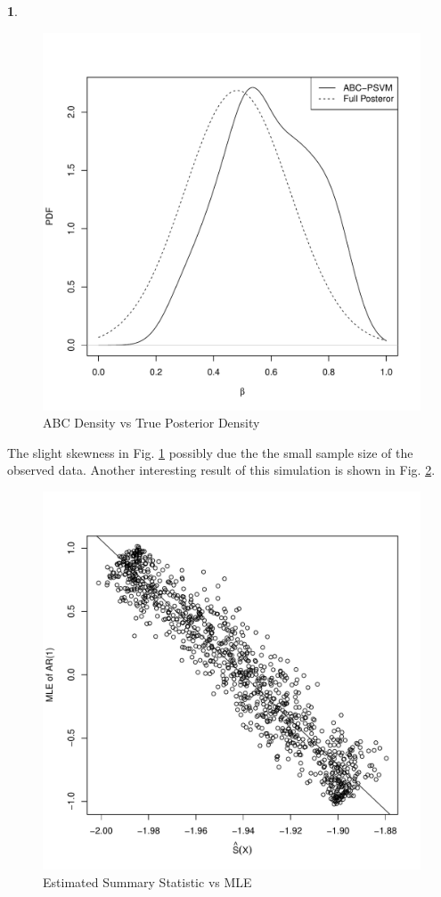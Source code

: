 \documentclass[oneside,english]{amsbook}
\numberwithin{section}{chapter}
\numberwithin{equation}{section}
\numberwithin{figure}{section}
\theoremstyle{plain}
\theoremstyle{plain}
\theoremstyle{definition}
\theoremstyle{plain}
\theoremstyle{plain}
\theoremstyle{remark}
\theoremstyle{definition}
\newtheorem{example}{\protect\examplename}
\theoremstyle{definition}
\providecommand{\examplename}{Example}
\begin{document}
\begin{example}
\begin{figure}
\includegraphics[scale=0.7]{ABCvsFull_100_1000_4.pdf}\protect\caption{ABC Density vs True Posterior Density\label{fig:ABC-vs-True}}
\end{figure}
The slight skewness in Fig. \ref{fig:ABC-vs-True} possibly due the
the small sample size of the observed data. Another interesting result
of this simulation is shown in Fig. \ref{fig:ss-vs-mle}. 
\begin{figure}
\includegraphics[scale=0.7]{ESSvsMLE_100_1000_4.pdf}\protect\caption{Estimated Summary Statistic vs MLE\label{fig:ss-vs-mle}}

\end{figure}
\end{example}
\end{document}
